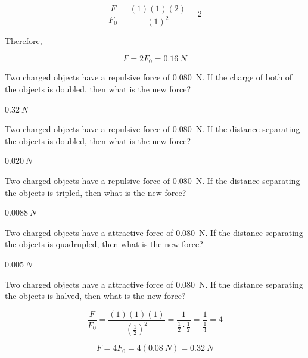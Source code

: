 \documentclass[]{exam}
\begin{document}
\begin{questions}
\begin{solution}
\begin{equation*}
    \frac{F}{F_0} = \frac{(1)(1)(2)}{(1)^2} = 2
\end{equation*}

Therefore,

\begin{equation*}
    F = 2F_0 = \boxed{\SI{0.16}{N}}
\end{equation*}

\end{solution}



\question
Two charged objects have a repulsive force of \SI{0.080}{N}. If the charge of both of the objects is doubled, then what is the new force?

\begin{solution}
$\SI{0.32}{N}$
\end{solution}

\question
Two charged objects have a repulsive force of \SI{0.080}{N}. If the distance separating the objects is doubled, then what is the new force?

\begin{solution}
$\SI{0.020}{N}$
\end{solution}

\question
Two charged objects have a repulsive force of \SI{0.080}{N}. If the distance separating the objects is tripled, then what is the new force?

\begin{solution}
$\SI{0.0088}{N}$
\end{solution}


\question
Two charged objects have a attractive force of \SI{0.080}{N}. If the distance separating the objects is quadrupled, then what is the new force?

\begin{solution}
$\SI{0.005}{N}$
\end{solution}

\question
Two charged objects have a attractive force of \SI{0.080}{N}. If the distance separating the objects is halved, then what is the new force?

\begin{solution}
\begin{equation*}
    \frac{F}{F_0} = \frac{(1)(1)(1)}{\left(\frac{1}{2}\right)^2} = \frac{1}{\frac{1}{2}\cdot\frac{1}{2}} = \frac{1}{\frac{1}{4}} = 4
\end{equation*}

\begin{equation*}
    F = 4 F_0 = 4(\SI{0.08}{N}) = \boxed{\SI{0.32}{N}}
\end{equation*}
\end{solution}


\end{questions}
\end{document}
